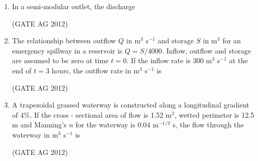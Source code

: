 \documentclass[journal]{IEEEtran}
\begin{document}
\begin{enumerate}
\item
In a semi-modular outlet, the discharge
\begin{enumerate}
\end{enumerate}
\hfill(GATE AG 2012)\\

\medskip

\item
The relationship between outflow $Q$ in m$^3$ s$^{-1}$ and storage $S$ in m$^3$ for an emergency spillway in a reservoir is $Q=S/4000$. Inflow, outflow and storage are assumed to be zero at time $t=0$. If the inflow rate is $300$ m$^{3}$ s$^{-1}$ at the end of $t=3$ hours, the outflow rate in m$^3$ s$^{-1}$ is
\begin{enumerate}
\end{enumerate}
\hfill(GATE AG 2012)\\

\medskip

\item
A trapezoidal grassed waterway is constructed along a longitudinal gradient of 4\%. If the cross - sectional area of flow is 1.52 m$^2$, wetted perimeter is 12.5 m and Manning's $n$ for the waterway is $0.04$ m$^{-1/3}$ s, the flow through the waterway in m$^3$ s$^{-1}$ is
\begin{enumerate}
\end{enumerate}
\hfill(GATE AG 2012)\\


\end{enumerate}
\end{document}
